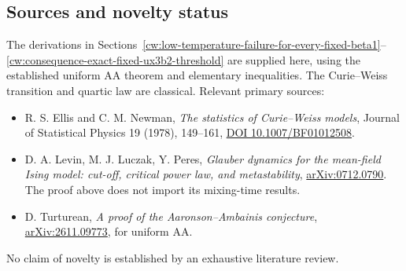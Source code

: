 \subsection{Sources and novelty status}\label{cw:sources-and-novelty-status}

The derivations in Sections~\ref{cw:low-temperature-failure-for-every-fixed-beta1}--\ref{cw:consequence-exact-fixed-ux3b2-threshold} are supplied here, using the established uniform AA theorem and elementary inequalities. The Curie--Weiss transition and quartic law are classical. Relevant primary sources:

\begin{itemize}
\tightlist
\item
  R. S. Ellis and C. M. Newman, \emph{The statistics of Curie--Weiss models}, Journal of Statistical Physics 19 (1978), 149--161, \href{https://doi.org/10.1007/BF01012508}{DOI 10.1007/BF01012508}.
\item
  D. A. Levin, M. J. Luczak, Y. Peres, \emph{Glauber dynamics for the mean-field Ising model: cut-off, critical power law, and metastability}, \href{https://arxiv.org/abs/0712.0790}{arXiv:0712.0790}. The proof above does not import its mixing-time results.
\item
  D. Turturean, \emph{A proof of the Aaronson--Ambainis conjecture}, \href{https://arxiv.org/abs/2611.09773}{arXiv:2611.09773}, for uniform AA.
\end{itemize}

No claim of novelty is established by an exhaustive literature review.
